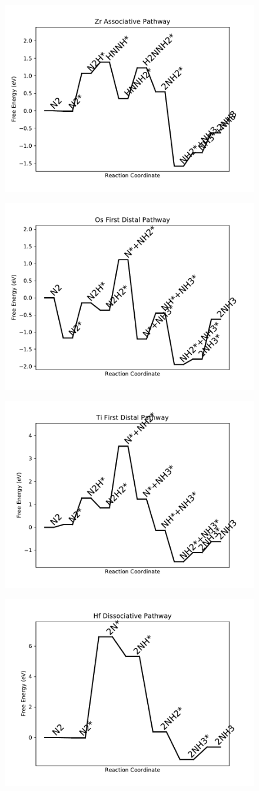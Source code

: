 \begin{figure}
\includegraphics[width=0.5\linewidth]{data/plots/Zr_associative.pdf}
\label{fig:Zr_associative}
\end{figure}

\begin{figure}
\includegraphics[width=0.5\linewidth]{data/plots/Os_distal_1.pdf}
\label{fig:Os_distal_1}
\end{figure}

\begin{figure}
\includegraphics[width=0.5\linewidth]{data/plots/Ti_distal_1.pdf}
\label{fig:Ti_distal_1}
\end{figure}

\begin{figure}
\includegraphics[width=0.5\linewidth]{data/plots/Hf_dissociative.pdf}
\label{fig:Hf_dissociative}
\end{figure}

